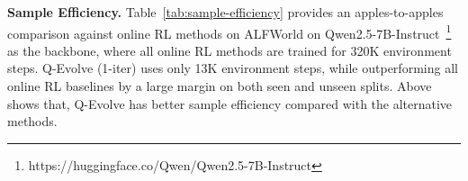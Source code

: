 \documentclass{article}
\newcommand{\cmark}{\textcolor{green!60!black}{\ding{51}}} %
\theoremstyle{plain}
\theoremstyle{definition}
\theoremstyle{remark}
\begin{document}


\textbf{Sample Efficiency.}
Table~\ref{tab:sample-efficiency} provides an apples-to-apples comparison against online RL methods on ALFWorld on Qwen2.5-7B-Instruct~\footnote{https://huggingface.co/Qwen/Qwen2.5-7B-Instruct} as the backbone, where all online RL methods are trained for 320K environment steps.
Q-Evolve (1-iter) uses only 13K environment steps, while outperforming all online RL baselines by a large margin on both seen and unseen splits. Above shows that, Q-Evolve has better sample efficiency compared with the alternative methods.
\end{document}
